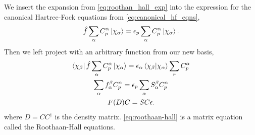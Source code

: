 We insert the expansion from \autoref{eq:roothan_hall_exp} into the expression 
for the canonical Hartree-Fock equations from \autoref{eq:canonical_hf_eqns},
\begin{equation}
    \hat{f}\sum_\alpha C^\alpha_p \ket{\chi_\alpha}
        = \epsilon_p \sum_\alpha C^\alpha_p \ket{\chi_\alpha}.
\end{equation}
Then we left project with an arbitrary function from our new basis,
\begin{gather}
    \begin{gathered}
        \bra{\chi_\beta} \hat{f} \sum_\alpha C^\alpha_p \ket{\chi_\alpha}
            = \epsilon_\alpha \braket{\chi_\beta}{\chi_\alpha} \sum_r C^\alpha_p \\
        \sum_\alpha f^\beta_\alpha C^\alpha_p = \epsilon_p \sum_\alpha S^\beta_\alpha C^\alpha_p \\
    \end{gathered} \\
    \label{eq:roothaan-hall}
    F(D) C = S C \epsilon.
\end{gather}
where $D=CC^\dagger$ is 
the density matrix.
\autoref{eq:roothaan-hall} is a matrix equation called the Roothaan-Hall equations.

